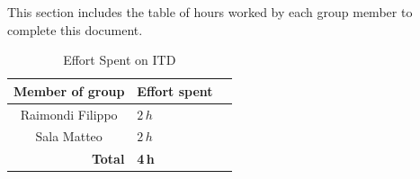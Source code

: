 \noindent This section includes the table of hours worked by each group member to complete this document.

\begin{table}[h!]
\centering
\begin{tabular}{c|l|c}
\hline
Member of group & \multicolumn{1}{c}{Effort spent} \\
\hline
\multirow{1}{*}{Raimondi Filippo} 
 & $2\,h$ \\
\hline
\multirow{1}{*}{Sala Matteo} 
 & $2\,h$ \\
\hline
\multicolumn{1}{r|}{\textbf{Total}} & \textbf{4\,h} \\
\hline
\end{tabular}
\caption{Effort Spent on ITD}
\end{table}